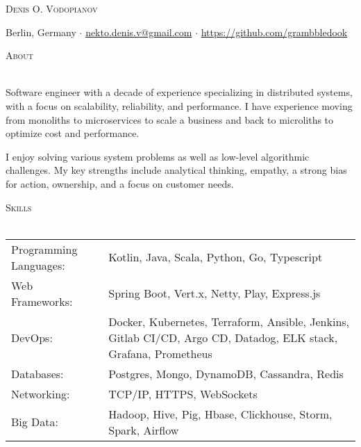 \documentclass[a4paper]{article}
\makeatletter
\newcommand{\lineunder} {
    \vspace*{-8pt} \\
    \hspace*{-18pt} \hrulefill \\
}
\newcommand{\header} [1] {
        {\hspace*{-18pt}\vspace*{6pt} \textsc{#1}}
    \vspace*{-6pt} \lineunder
}
\def\email{nekto.denis.v@gmail.com}
\def\phone{555-55-55}
\makeatother
\begin{document}
    \vspace*{-40pt}


    \vspace*{-10pt}
    \begin{center}
        \Huge \scshape {Denis O. Vodopianov} \\ \vspace{1mm}
    \end{center}

    \begin{center}
        Berlin, Germany $\cdot$
        \href{mailto:\email}{\email} $\cdot$
        \url{https://github.com/grambbledook}\\
    \end{center}

    \header{About}
    \begin{raggedright}

        Software engineer with a decade of experience specializing in distributed systems, with a focus on scalability, reliability, and performance.
        I have experience moving from monoliths to microservices to scale a business and back to microliths
        to optimize cost and performance. \break

        I enjoy solving various system problems as well as low-level algorithmic challenges.
        My key strengths include analytical thinking, empathy, a strong bias for action, ownership, and a focus on customer needs. \\
    \end{raggedright}
    \vspace{2mm}

    \header{Skills}
    \begin{tabularx}{\textwidth}{p{5cm} X}
        Programming Languages: & Kotlin, Java, Scala, Python, Go, Typescript                                                                     \\
        Web Frameworks:        & Spring Boot, Vert.x, Netty, Play, Express.js                                                                    \\
        DevOps:                & Docker, Kubernetes, Terraform, Ansible, Jenkins, Gitlab CI/CD, Argo CD, Datadog, ELK stack, Grafana, Prometheus \\
        Databases:             & Postgres, Mongo, DynamoDB, Cassandra, Redis                                                                     \\
        Networking:            & TCP/IP, HTTPS, WebSockets                                                                                       \\
        Big Data:              & Hadoop, Hive, Pig, Hbase, Clickhouse, Storm, Spark, Airflow                                                     \\
    \end{tabularx}
    \vspace{2mm}
\end{document}
